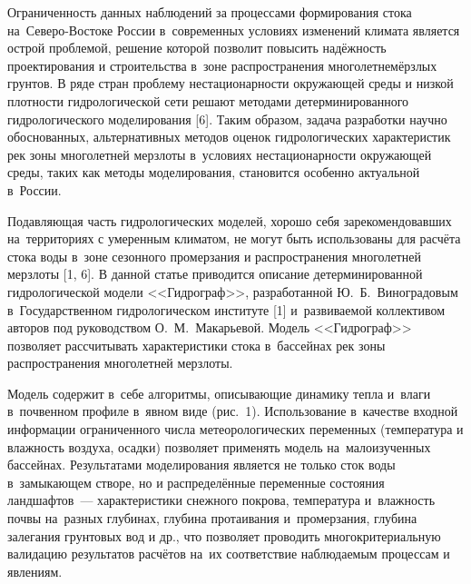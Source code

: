  

\makeProcTitle
{}

Ограниченность данных наблюдений за процессами формирования стока на~Северо-Востоке России в~современных условиях изменений климата является острой проблемой, решение которой позволит повысить надёжность проектирования и строительства в~зоне распространения многолетнемёрзлых грунтов. В ряде стран проблему нестационарности окружающей среды и низкой плотности гидрологической сети решают методами детерминированного гидрологического моделирования [6]. Таким образом, задача разработки научно обоснованных, альтернативных методов оценок гидрологических характеристик рек зоны многолетней мерзлоты в~условиях нестационарности окружающей среды, таких как методы моделирования, становится особенно актуальной в~России.

Подавляющая часть гидрологических моделей, хорошо себя зарекомендовавших на~территориях с умеренным климатом, не могут быть использованы для расчёта стока воды в~зоне сезонного промерзания и распространения многолетней мерзлоты [1, 6]. В данной статье приводится описание детерминированной гидрологической модели <<Гидрограф>>, разработанной Ю.~Б.~Виноградовым в~Государственном гидрологическом институте [1] и~развиваемой коллективом авторов под руководством О.~М.~Макарьевой. Модель <<Гидрограф>> позволяет рассчитывать характеристики стока в~бассейнах рек зоны распространения многолетней мерзлоты.

Модель содержит в~себе алгоритмы, описывающие динамику тепла и~влаги в~почвенном профиле в~явном виде (рис.~1). Использование в~качестве входной информации ограниченного числа метеорологических переменных (температура и влажность воздуха, осадки) позволяет применять модель на~малоизученных бассейнах. Результатами моделирования является не только сток воды в~замыкающем створе, но и распределённые переменные состояния ландшафтов~--- характеристики снежного покрова, температура и~влажность почвы на~разных глубинах, глубина протаивания и~промерзания, глубина залегания грунтовых вод и др., что позволяет проводить многокритериальную валидацию результатов расчётов на~их соответствие наблюдаемым процессам и явлениям.


